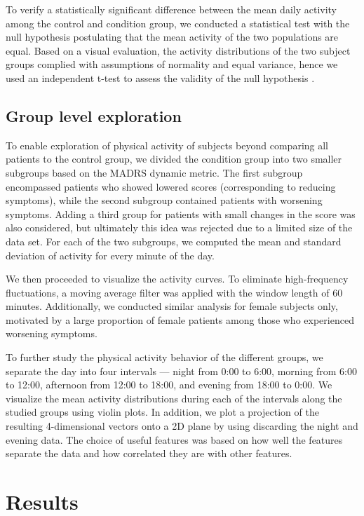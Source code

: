 \documentclass[12pt]{article}
\begin{document}
To verify a statistically significant difference between the mean daily activity among the control and condition group, we conducted a statistical test with the null hypothesis postulating that the mean activity of the two populations are equal. Based on a visual evaluation, the activity distributions of the two subject groups complied with assumptions of normality and equal variance, hence we used an independent t-test to assess the validity of the null hypothesis \parencite{student1908probable}.

\subsection{Group level exploration}

To enable exploration of physical activity of subjects beyond comparing all patients to the control group, we divided the condition group into two smaller subgroups based on the MADRS dynamic metric. The first subgroup encompassed patients who showed lowered scores (corresponding to reducing symptoms), while the second subgroup contained patients with worsening symptoms. Adding a third group for patients with small changes in the score was also considered, but ultimately this idea was rejected due to a limited size of the data set. For each of the two subgroups, we computed the mean and standard deviation of activity for every minute of the day.

We then proceeded to visualize the activity curves. To eliminate high-frequency fluctuations, a moving average filter was applied with the window length of 60 minutes. Additionally, we conducted similar analysis for female subjects only, motivated by a large proportion of female patients among those who experienced worsening symptoms.

To further study the physical activity behavior of the different groups, we separate the day into four intervals — night from 0:00 to 6:00, morning from 6:00 to 12:00, afternoon from 12:00 to 18:00, and evening from 18:00 to 0:00. We visualize the mean activity distributions during each of the intervals along the studied groups using violin plots. In addition, we plot a projection of the resulting 4-dimensional vectors onto a 2D plane by using discarding the night and evening data. The choice of useful features was based on how well the features separate the data and how correlated they are with other features.

\section{Results}
\end{document}
